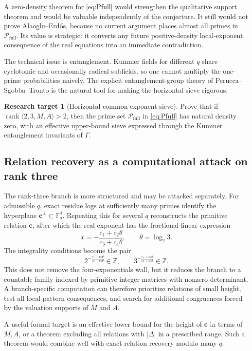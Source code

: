 \documentclass[11pt]{article}
\theoremstyle{definition}
\newtheorem{problem}[theorem]{Research target}
\theoremstyle{remark}
\newcommand{\Z}{\mathbb{Z}}
\newcommand{\F}{\mathbb{F}}
\newcommand{\rank}{\operatorname{rank}}
\begin{document}
A zero-density theorem for \eqref{eq:Pfull} would strengthen the qualitative support theorem and
would be valuable independently of the conjecture.  It still would not prove Alaoglu--Erd\H{o}s,
because no current argument places almost all primes in $\mathcal P_{\mathrm{full}}$.  Its value
is strategic: it converts any future positive-density local-exponent consequence of the real
equations into an immediate contradiction.

The technical issue is entanglement.  Kummer fields for different $q$ share cyclotomic and
occasionally radical subfields, so one cannot multiply the one-prime probabilities naively.
The explicit entanglement-group theory of Perucca--Sgobba--Tronto is the natural tool for making
the horizontal sieve rigorous.

\begin{problem}[Horizontal common-exponent sieve]\label{prob:horizontalsieve}
Prove that if $\rank\langle2,3,M,A\rangle>2$, then the prime set
$\mathcal P_{\mathrm{full}}$ in \eqref{eq:Pfull} has natural density zero, with an effective
upper-bound sieve expressed through the Kummer entanglement invariants of $\Gamma$.
\end{problem}

\subsection{Relation recovery as a computational attack on rank three}

The rank-three branch is more structured and may be attacked separately.
For admissible $q$, exact residue logs at sufficiently many primes identify the hyperplane
$\bm c^\perp\subset\F_q^4$.  Repeating this for several $q$ reconstructs the primitive relation
$\bm c$, after which the real exponent has the fractional-linear expression
\[
       x=-\frac{c_1+c_2\theta}{c_3+c_4\theta},
       \qquad \theta=\log_2 3.
       \tag{10.6}\label{eq:mobiusx}
\]
The integrality conditions become the pair
\[
  2^{-\frac{c_1+c_2\theta}{c_3+c_4\theta}}\in\Z,
  \qquad
  3^{-\frac{c_1+c_2\theta}{c_3+c_4\theta}}\in\Z.
\]
This does not remove the four-exponentials wall, but it reduces the branch to a countable family
indexed by primitive integer matrices with nonzero determinant.  A branch-specific computation
can therefore prioritize relations of small height, test all local pattern consequences, and
search for additional congruences forced by the valuation supports of $M$ and $A$.

A useful formal target is an effective lower bound for the height of $\bm c$ in terms of $M,A$,
or a theorem excluding all relations with $|\Delta|$ in a prescribed range.  Such a theorem
would combine well with exact relation recovery modulo many $q$.
\end{document}
